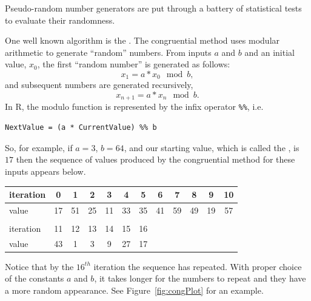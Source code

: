 Pseudo-random number generators are put through a battery of
statistical tests to evaluate their randomness.  

One well
known algorithm is the .  The congruential
method uses modular arithmetic to generate ``random'' numbers.  From
inputs $a$ and $b$ and an initial value, $x_0$, the first ``random
number'' is generated as follows:
$$ x_1 = a * x_0 \mod b, $$
and subsequent numbers are generated recursively,
$$ x_{n+1} = a * x_n \mod b .$$
In R, the modulo function is represented by the infix operator
\verb+%%+, i.e. 
\begin{verbatim}
NextValue = (a * CurrentValue) %% b
\end{verbatim}

So, for example, if $a=3$, $b=64$, and our starting value, which is
called the , is $17$ then the sequence of values produced by
the congruential method for these inputs appears below.

\medskip

\begin{tabular}{l|ccccccccccc}
iteration & 0 & 1 & 2 & 3 & 4 & 5 & 6 & 7 &  8 & 9 & 10 \\
\hline
value &17 & 51 & 25 & 11 & 33 & 35 & 41 & 59 & 49 & 19 & 57 \\
\\
iteration &11 & 12 & 13 & 14 & 15 & 16 \\
\hline
value & 43 & 1 &  3 & 9 & 27 & 17 \\
\end{tabular}

\medskip

Notice that by the $16^{th}$ iteration the sequence has repeated.
With proper choice of the constants $a$ and $b$, it takes longer for
the numbers to repeat and they have a more random appearance. See
Figure~\ref{fig:congPlot} for an example.

